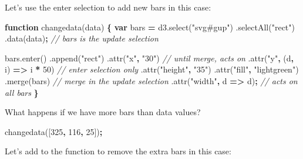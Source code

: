 \documentclass[openany]{book}
\newenvironment{Shaded}{\begin{snugshade}}{\end{snugshade}}
\newcommand{\AttributeTok}[1]{\textcolor[rgb]{0.77,0.63,0.00}{#1}}
\newcommand{\CommentTok}[1]{\textcolor[rgb]{0.56,0.35,0.01}{\textit{#1}}}
\newcommand{\DecValTok}[1]{\textcolor[rgb]{0.00,0.00,0.81}{#1}}
\newcommand{\KeywordTok}[1]{\textcolor[rgb]{0.13,0.29,0.53}{\textbf{#1}}}
\newcommand{\NormalTok}[1]{#1}
\newcommand{\OperatorTok}[1]{\textcolor[rgb]{0.81,0.36,0.00}{\textbf{#1}}}
\newcommand{\StringTok}[1]{\textcolor[rgb]{0.31,0.60,0.02}{#1}}
\newcommand{\VariableTok}[1]{\textcolor[rgb]{0.00,0.00,0.00}{#1}}
\begin{document}
Let's use the enter selection to add new bars in this case:

\begin{Shaded}
\begin{Highlighting}[]
\KeywordTok{function} \AttributeTok{changedata}\NormalTok{(data) }\OperatorTok{\{}
  \KeywordTok{var}\NormalTok{ bars }\OperatorTok{=} \VariableTok{d3}\NormalTok{.}\AttributeTok{select}\NormalTok{(}\StringTok{"svg#gup"}\NormalTok{) }
\NormalTok{    .}\AttributeTok{selectAll}\NormalTok{(}\StringTok{"rect"}\NormalTok{)}
\NormalTok{    .}\AttributeTok{data}\NormalTok{(data)}\OperatorTok{;}    \CommentTok{// bars is the update selection}
    
  \VariableTok{bars}\NormalTok{.}\AttributeTok{enter}\NormalTok{()}
\NormalTok{    .}\AttributeTok{append}\NormalTok{(}\StringTok{"rect"}\NormalTok{)}
\NormalTok{      .}\AttributeTok{attr}\NormalTok{(}\StringTok{"x"}\OperatorTok{,} \StringTok{"30"}\NormalTok{)  }\CommentTok{// until merge, acts on}
\NormalTok{      .}\AttributeTok{attr}\NormalTok{(}\StringTok{"y"}\OperatorTok{,}\NormalTok{ (d}\OperatorTok{,}\NormalTok{ i) }\OperatorTok{=>}\NormalTok{ i }\OperatorTok{*} \DecValTok{50}\NormalTok{) }\CommentTok{// enter selection only}
\NormalTok{      .}\AttributeTok{attr}\NormalTok{(}\StringTok{"height"}\OperatorTok{,} \StringTok{"35"}\NormalTok{)  }
\NormalTok{      .}\AttributeTok{attr}\NormalTok{(}\StringTok{"fill"}\OperatorTok{,} \StringTok{"lightgreen"}\NormalTok{)}
\NormalTok{    .}\AttributeTok{merge}\NormalTok{(bars) }\CommentTok{// merge in the update selection}
\NormalTok{      .}\AttributeTok{attr}\NormalTok{(}\StringTok{"width"}\OperatorTok{,}\NormalTok{ d }\OperatorTok{=>}\NormalTok{ d)}\OperatorTok{;} \CommentTok{// acts on all bars}
  \OperatorTok{\}}
\end{Highlighting}
\end{Shaded}

What happens if we have more bars than data values?

\begin{Shaded}
\begin{Highlighting}[]
\AttributeTok{changedata}\NormalTok{([}\DecValTok{325}\OperatorTok{,} \DecValTok{116}\OperatorTok{,} \DecValTok{25}\NormalTok{])}\OperatorTok{;}
\end{Highlighting}
\end{Shaded}

Let's add to the function to remove the extra bars in this case:
\end{document}
